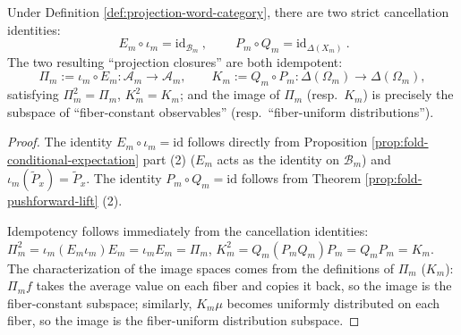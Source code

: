 \begin{proposition}\label{prop:projection-word-rewrite}
Under Definition \ref{def:projection-word-category}, there are two strict cancellation identities:
\[
\boxed{\ E_m\circ \iota_m=\mathrm{id}_{\mathcal{B}_m}\ },\qquad
\boxed{\ P_m\circ Q_m=\mathrm{id}_{\Delta(X_m)}\ }.
\]
The two resulting ``projection closures'' are both idempotent:
\[
\Pi_m:=\iota_m\circ E_m:\mathcal{A}_m\to\mathcal{A}_m,\qquad
K_m:=Q_m\circ P_m:\Delta(\Omega_m)\to\Delta(\Omega_m),
\]
satisfying \(\Pi_m^2=\Pi_m\), \(K_m^2=K_m\); and the image of \(\Pi_m\) (resp.\ \(K_m\)) is precisely the subspace of ``fiber-constant observables'' (resp.\ ``fiber-uniform distributions'').
\end{proposition}
\begin{proof}
The identity \(E_m\circ\iota_m=\mathrm{id}\) follows directly from Proposition \ref{prop:fold-conditional-expectation} part (2) (\(E_m\) acts as the identity on \(\mathcal{B}_m\)) and \(\iota_m(\widetilde P_x)=\widetilde P_x\).
The identity \(P_m\circ Q_m=\mathrm{id}\) follows from Theorem \ref{prop:fold-pushforward-lift} (2).
\par
Idempotency follows immediately from the cancellation identities: \(\Pi_m^2=\iota_m(E_m\iota_m)E_m=\iota_mE_m=\Pi_m\), \(K_m^2=Q_m(P_mQ_m)P_m=Q_mP_m=K_m\).
The characterization of the image spaces comes from the definitions of \(\Pi_m\) (\(K_m\)): \(\Pi_m f\) takes the average value on each fiber and copies it back, so the image is the fiber-constant subspace; similarly, \(K_m\mu\) becomes uniformly distributed on each fiber, so the image is the fiber-uniform distribution subspace. \qedhere
\end{proof}


